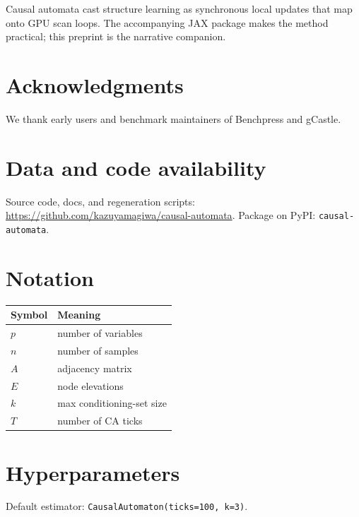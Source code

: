 \documentclass{article}
\begin{document}
Causal automata cast structure learning as synchronous local updates that map
onto GPU scan loops.
The accompanying JAX package makes the method practical; this preprint is the
narrative companion.

\section*{Acknowledgments}

We thank early users and benchmark maintainers of Benchpress and gCastle.

\section*{Data and code availability}

Source code, docs, and regeneration scripts:
\url{https://github.com/kazuyamagiwa/causal-automata}.
Package on PyPI: \texttt{causal-automata}.




\appendix
\section{Notation}
\label{app:notation}
\begin{center}
\begin{tabular}{ll}
  \toprule
  Symbol & Meaning \\
  \midrule
  \(p\) & number of variables \\
  \(n\) & number of samples \\
  \(A\) & adjacency matrix \\
  \(E\) & node elevations \\
  \(k\) & max conditioning-set size \\
  \(T\) & number of CA ticks \\
  \bottomrule
\end{tabular}
\end{center}

\section{Hyperparameters}
\label{app:hparams}
Default estimator: \texttt{CausalAutomaton(ticks=100, k=3)}.
\end{document}
